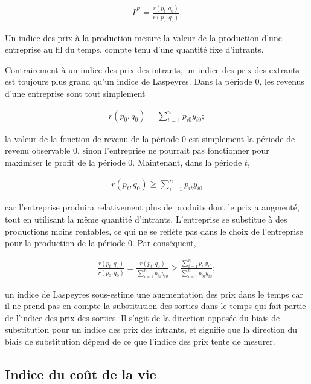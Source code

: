 \documentclass[
]{article}
\begin{document}
\begin{align*}
I^{R} = \frac{r(p_{t}, q_{0})}{r(p_{0}, q_{0})}.
\end{align*}

Un indice des prix à la production mesure la valeur de la production d'une entreprise au fil du temps, compte tenu d'une quantité fixe d'intrants.

Contrairement à un indice des prix des intrants, un indice des prix des extrants est toujours plus grand qu'un indice de Laspeyres. Dans la période 0, les revenus d'une entreprise sont tout simplement

\begin{align*}
r(p_{0}, q_{0}) = \sum_{i = 1}^{n} p_{i0} y_{i0};
\end{align*}

la valeur de la fonction de revenu de la période 0 est simplement la période de revenu observable 0, sinon l'entreprise ne pourrait pas fonctionner pour maximiser le profit de la période 0. Maintenant, dans la période \(t\),

\begin{align*}
r(p_{t}, q_{0}) \geq \sum_{i = 1}^{n} p_{it} y_{i0}
\end{align*}

car l'entreprise produira relativement plus de produits dont le prix a augmenté, tout en utilisant la même quantité d'intrants. L'entreprise se substitue à des productions moins rentables, ce qui ne se reflète pas dans le choix de l'entreprise pour la production de la période 0. Par conséquent,

\begin{align*}
\frac{r(p_{t}, q_{0})}{r(p_{0}, q_{0})} = \frac{r(p_{t}, q_{0})}{\sum_{i = 1}^{n} p_{i0} y_{i0}} \geq \frac{\sum_{i = 1}^{n} p_{it} y_{i0}}{\sum_{i = 1 }^{n} p_{i0} y_{i0}};
\end{align*}

un indice de Laspeyres sous-estime une augmentation des prix dans le temps car il ne prend pas en compte la substitution des sorties dans le temps qui fait partie de l'indice des prix des sorties. Il s'agit de la direction opposée du biais de substitution pour un indice des prix des intrants, et signifie que la direction du biais de substitution dépend de ce que l'indice des prix tente de mesurer.

\hypertarget{indice-du-couxfbt-de-la-vie}{%
\subsection{Indice du coût de la vie}\label{indice-du-couxfbt-de-la-vie}}
\end{document}

